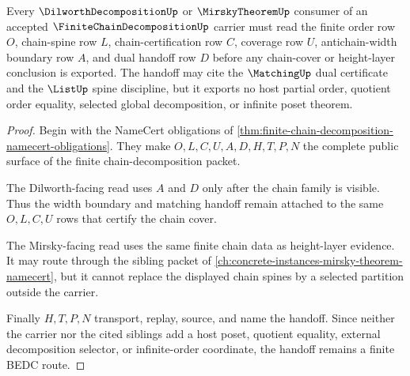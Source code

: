\begin{theorem}
\label{thm:finite-chain-decomposition-dilworth-handoff}
Every $\DilworthDecompositionUp$ or $\MirskyTheoremUp$ consumer of an accepted $\FiniteChainDecompositionUp$ carrier must read the finite order row $O$, chain-spine row $L$, chain-certification row $C$, coverage row $U$, antichain-width boundary row $A$, and dual handoff row $D$ before any chain-cover or height-layer conclusion is exported. The handoff may cite the $\MatchingUp$ dual certificate and the $\ListUp$ spine discipline, but it exports no host partial order, quotient order equality, selected global decomposition, or infinite poset theorem.
\end{theorem}
\begin{proof}
Begin with the NameCert obligations of \autoref{thm:finite-chain-decomposition-namecert-obligations}. They make $O,L,C,U,A,D,H,T,P,N$ the complete public surface of the finite chain-decomposition packet.

The Dilworth-facing read uses $A$ and $D$ only after the chain family is visible. Thus the width boundary and matching handoff remain attached to the same $O,L,C,U$ rows that certify the chain cover.

The Mirsky-facing read uses the same finite chain data as height-layer evidence. It may route through the sibling packet of \autoref{ch:concrete-instances-mirsky-theorem-namecert}, but it cannot replace the displayed chain spines by a selected partition outside the carrier.

Finally $H,T,P,N$ transport, replay, source, and name the handoff. Since neither the carrier nor the cited siblings add a host poset, quotient equality, external decomposition selector, or infinite-order coordinate, the handoff remains a finite BEDC route.
\end{proof}



